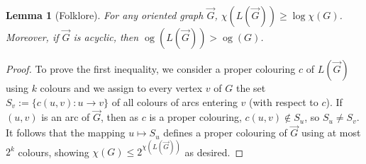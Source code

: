 \documentclass[11pt,a4aper]{article}
\newtheorem{lemma}[theorem]{Lemma}
\renewcommand{\geq}{\geqslant}
\renewcommand{\leq}{\leqslant}
\DeclareRobustCommand*{\ora}{\overrightarrow}
\DeclareMathOperator{\og}{og}
\newcommand*{\orG}{\ora{G}}
\newcommand{\clement}[1]{{\color{orange} CL: #1}}
\newcommand{\ugo}[1]{{\color{red} UG: #1}}
\begin{document}
\begin{lemma}[Folklore]\label{lem:line-graph}
  For any oriented graph $\orG$, $\chi(L(\orG)) \geq \log \chi(G)$. Moreover, if $\orG$ is acyclic, then $\og(L(\orG))
  > \og(G)$. 
\end{lemma}
\begin{proof}
  To prove the first inequality, we consider a proper colouring $c$ of $L(\orG)$
  using $k$ colours and we assign to every vertex $v$ of $G$ the set $S_v:=\{c(u,v): u\to v\}$ of
  all colours of arcs entering $v$ (with respect to $c$). If $(u,v)$ is
  an arc of $\orG$, then as $c$ is a proper colouring, $c(u,v)\notin S_u$, so
  $S_u\neq S_v$. It follows that the mapping $u\mapsto S_u$ defines a proper
  colouring of $\orG$ using at most $2^k$ colours, showing
  $\chi(G) \leq 2^{\chi(L(\orG))}$ as desired.


\end{proof}
\end{document}
